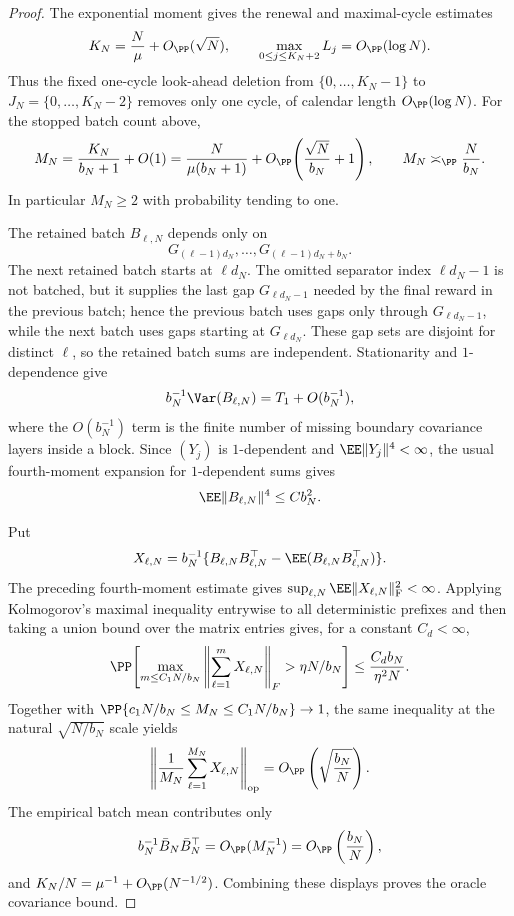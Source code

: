 \begin{proof}
The exponential moment gives the renewal and maximal-cycle estimates
\[
K_N=\frac{N}{\mu}+O_{\PP}(\sqrt N),\qquad
\max_{0\le j\le K_N+2}L_j=O_{\PP}(\log N).
\]
Thus the fixed one-cycle look-ahead deletion from
\(\{0,\ldots,K_N-1\}\) to \(J_N=\{0,\ldots,K_N-2\}\) removes only one cycle,
of calendar length \(O_{\PP}(\log N)\).  For the stopped batch count above,
\[
M_N=\frac{K_N}{b_N+1}+O(1)
=\frac{N}{\mu(b_N+1)}+O_{\PP}\!\left(\frac{\sqrt N}{b_N}+1\right),
\qquad
M_N\asymp_{\PP}\frac{N}{b_N}.
\]
In particular \(M_N\ge2\) with probability tending to one.

The retained batch \(B_{\ell,N}\) depends only on
\[
G_{(\ell-1)d_N},\ldots,G_{(\ell-1)d_N+b_N}.
\]
The next retained batch starts at \(\ell d_N\).  The omitted separator index
\(\ell d_N-1\) is not batched, but it supplies the last gap
\(G_{\ell d_N-1}\) needed by the final reward in the previous batch; hence the
previous batch uses gaps only through \(G_{\ell d_N-1}\), while the next batch
uses gaps starting at \(G_{\ell d_N}\).  These gap sets are disjoint for
distinct \(\ell\), so the retained batch sums are independent.  Stationarity
and \(1\)-dependence give
\[
b_N^{-1}\Var(B_{\ell,N})=T_1+O(b_N^{-1}),
\]
where the \(O(b_N^{-1})\) term is the finite number of missing boundary
covariance layers inside a block.  Since \((Y_j)\) is \(1\)-dependent and
\(\EE\|Y_j\|^4<\infty\), the usual fourth-moment expansion for
\(1\)-dependent sums gives
\[
\EE\|B_{\ell,N}\|^4\le Cb_N^2 .
\]

Put
\[
X_{\ell,N}
=b_N^{-1}\{B_{\ell,N}B_{\ell,N}^\top
-\EE(B_{\ell,N}B_{\ell,N}^\top)\}.
\]
The preceding fourth-moment estimate gives
\(\sup_{\ell,N}\EE\|X_{\ell,N}\|_{\operatorname F}^2<\infty\).  Applying
Kolmogorov's maximal inequality entrywise to all deterministic prefixes and
then taking a union bound over the matrix entries gives, for a constant
\(C_d<\infty\),
\[
\PP\!\left[
\max_{m\le C_1N/b_N}
\left\|\sum_{\ell=1}^mX_{\ell,N}\right\|_F
>\eta N/b_N
\right]
\le \frac{C_d b_N}{\eta^2N}.
\]
Together with
\(\PP\{c_1N/b_N\le M_N\le C_1N/b_N\}\to1\), the same inequality at the
natural \(\sqrt{N/b_N}\) scale yields
\[
\left\|
\frac1{M_N}\sum_{\ell=1}^{M_N}X_{\ell,N}
\right\|_{\operatorname{op}}
=O_{\PP}\left(\sqrt{\frac{b_N}{N}}\right).
\]
The empirical batch mean contributes only
\[
b_N^{-1}\bar B_N\bar B_N^\top
=O_{\PP}(M_N^{-1})
=O_{\PP}\left(\frac{b_N}{N}\right),
\]
and \(K_N/N=\mu^{-1}+O_{\PP}(N^{-1/2})\).  Combining these displays proves the
oracle covariance bound.


\end{proof}
